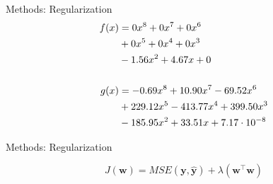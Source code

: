 \begin{slide}{Methods: Regularization}
  \begin{align*}
  f(x) &= 0x^8 + 0x^7 + 0x^6\\
       &+ 0x^5 + 0x^4 + 0x^3\\
       &- 1.56x^2  + 4.67x + 0\\
  \vspace{1cm}\\
  g(x) &= -0.69 x^8 + 10.90 x^7 - 69.52 x^6\\
       &+ 229.12 x^5 - 413.77  x^4 + 399.50 x^3\\
       &- 185.95 x^2 + 33.51 x + 7.17 \cdot 10^{-8}
  \end{align*}
\end{slide}

\begin{slide}{Methods: Regularization}

    $$J(\mathbf{w}) = MSE(\mathbf{y}, \mathbf{\hat{y}}) + \lambda (\mathbf{w}^\top\mathbf{w})$$%
\end{slide}
